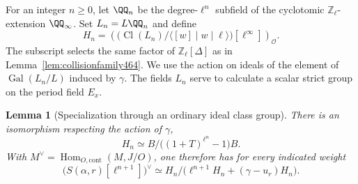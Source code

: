 \documentclass[a4paper,11pt]{article}
\newtheorem{lemma}[proposition]{Lemma}
\theoremstyle{definition}
\theoremstyle{remark}
\newcommand{\ZZ}{\mathbb Z}\newcommand{\ord}{\operatorname{ord}}
\numberwithin{equation}{section}
\newcommand{\Cl}{\operatorname{Cl}}
\begin{document}
For an integer \(n\ge0\), let \(\QQ_n\) be the degree-\(\ell^n\)
subfield of the cyclotomic \(\ZZ_\ell\)-extension \(\QQ_\infty\).
Set \(L_n=L\QQ_n\) and define
\[
 H_n=\left(
     \bigl(\Cl(L_n)/\langle[w]\mid w\mid\ell\rangle\bigr)
           [\ell^\infty]\right)_{\mathcal O}.
\]
The subscript selects the same factor of \(\ZZ_\ell[\Delta]\)
as in Lemma~\ref{lem:collisionfamily464}. We use the action on
ideals of the element of \(\operatorname{Gal}(L_n/L)\) induced
by \(\gamma\). The fields \(L_n\) serve to calculate a scalar
strict group on the period field \(E_x\).

\begin{lemma}[Specialization through an ordinary ideal class group]\leavevmode
\label{lem:splitcyclolevel467}
There is an isomorphism respecting the action of \(\gamma\),
\[
        H_n\simeq B/\bigl((1+T)^{\ell^n}-1\bigr)B.
\]
With \(M^\vee=\operatorname{Hom}_{O,\mathrm{cont}}(M,J/O)\),
one therefore has for every indicated weight
\[
  \bigl(S(\alpha,r)[\ell^{n+1}]\bigr)^\vee
     \simeq H_n\big/
        \bigl(\ell^{n+1}H_n+(\gamma-u_r)H_n\bigr).
\]
\end{lemma}
\end{document}
